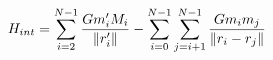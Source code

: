 \documentclass[preview]{standalone}
\begin{document}
\begin{align*}
\special{dvisvgm:raw <g id='unique000'>}H_{int} = \sum_{i=2}^{N-1} \frac{Gm'_i M_i}{\norm{r'_i}} - \sum_{i=0}^{N-1} \sum_{j=i+1}^{N-1} \frac{Gm_im_j}{\norm{r_i - r_j}}\special{dvisvgm:raw </g>}
\end{align*}
\end{document}
